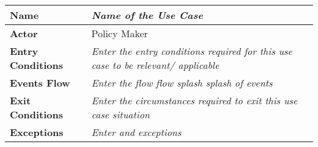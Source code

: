
\begin{center}
\begin{tabular}{|l|>{\raggedright\arraybackslash}m{12cm}|}

    \hline
    \textbf{Name} & \textit{Name of the Use Case}\\
    \hline
   	\textbf{Actor} & Policy Maker\\
    \hline
    \textbf{Entry Conditions} & \textit{Enter the entry conditions required for this use case to be relevant/ applicable}\\
    \hline
    \textbf{Events Flow} & \textit{Enter the flow flow splash splash of events}\\
    \hline
    \textbf{Exit Conditions} & \textit{Enter the circumstances required to exit this use case situation}\\
    \hline
    \textbf{Exceptions} & \textit{Enter and exceptions}\\
    \hline
\end{tabular}
\end{center}